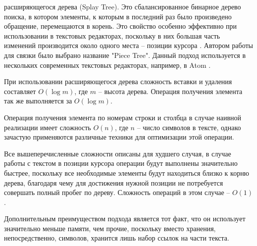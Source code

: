 \documentclass{fefu}
\begin{document}
				расширяющегося дерева (Splay Tree). Это сбалансированное бинарное дерево 
				поиска, в котором элементы, к которым в последний раз было произведено
				обращение, перемещаются в корень. Это свойство особенно эффективно при
				использовании в текстовых редакторах, поскольку в них большая часть изменений
				производится около одного места -- позиции курсора \cite{SplayTreeArticle}.
				Автором работы для связки было выбрано название "Piece Tree". Данный подход
				используется в нескольких современных текстовых редакторах, например, в 
				Atom \cite{TextEditorsHabr}.
				\par При использовании расширяющегося дерева сложность вставки и удаления
				составляет $O(\log{m})$, где $m$ -- высота дерева. Операция получения
				элемента так же выполняется за $O(\log{m})$.
				\par Операция получения элемента по номерам строки и столбца в случае наивной
				реализации имеет сложность $O(n)$, где $n$ -- число символов в тексте, однако
				зачастую применяются различные техники для оптимизации этой операции.
				\par Все вышеперечисленные сложности описаны для худшего случая, в случае
				работы с текстом в позиции курсора операции будут выполнены значительно 
				быстрее, поскольку все необходимые элементы будут находиться близко к корню
				дерева, благодаря чему для достижения нужной позиции не потребуется совершать
				полный пробег по дереву. Сложность операций в этом случае -- $O(1)$.
				\par Дополнительным преимуществом подхода является тот факт, что он
				использует значительно меньше памяти, чем прочие, поскольку вместо хранения,
				непосредственно, символов, хранится лишь набор ссылок на части текста.
\end{document}
